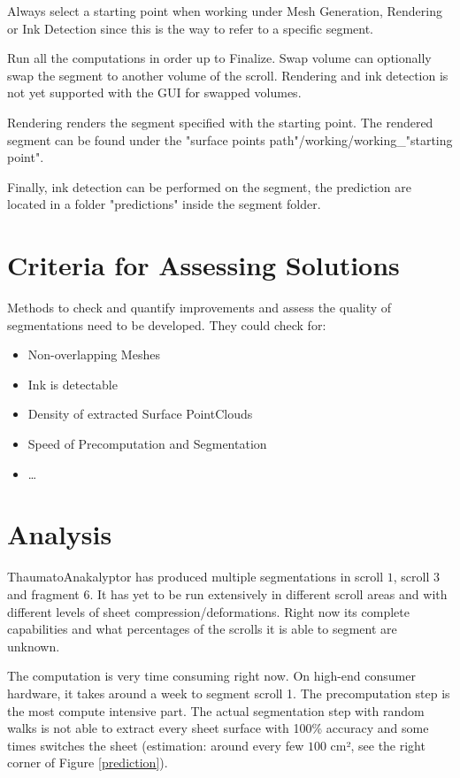 \documentclass[peerreview]{IEEEtran}
\begin{document}
Always select a starting point when working under Mesh Generation, Rendering or Ink Detection since this is the way to refer to a specific segment.

Run all the computations in order up to Finalize. Swap volume can optionally swap the segment to another volume of the scroll. Rendering and ink detection is not yet supported with the GUI for swapped volumes.

Rendering renders the segment specified with the starting point. The rendered segment can be found under the "surface points path"/working/working\_"starting point".

Finally, ink detection can be performed on the segment, the prediction are located in a folder "predictions" inside the segment folder.

\section{Criteria for Assessing Solutions} \label{sec:criteria}
Methods to check and quantify improvements and assess the quality of segmentations need to be developed. They could check for:
\begin{itemize}
    \item Non-overlapping Meshes
    \item Ink is detectable
    \item Density of extracted Surface PointClouds
    \item Speed of Precomputation and Segmentation
    \item \ldots
\end{itemize}  

\section{Analysis}
ThaumatoAnakalyptor has produced multiple segmentations in scroll $1$, scroll $3$ and fragment $6$.
It has yet to be run extensively in different scroll areas and with different levels of sheet compression/deformations.
Right now its complete capabilities and what percentages of the scrolls it is able to segment are unknown.

The computation is very time consuming right now. On high-end consumer hardware, it takes around a week to segment scroll 1. The precomputation step is the most compute intensive part.
The actual segmentation step with random walks is not able to extract every sheet surface with 100\% accuracy and some times switches the sheet (estimation: around every few $100$ cm², see the right corner of Figure \ref{prediction}).
\end{document}
